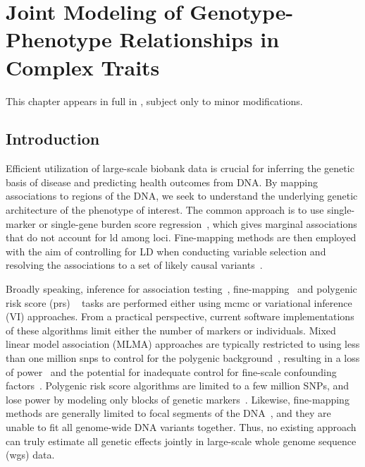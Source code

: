 
\chapter[Joint Modeling of Genotype-Phenotype Relationships in Complex Traits][Joint Modeling of Genotype-Phenotype Relationships]{Joint Modeling of Genotype-Phenotype Relationships in Complex Traits}
\label{ch:gvamp}

This chapter appears in full in , subject only to minor modifications.

\section{Introduction} 
Efficient utilization of large-scale biobank data is crucial for inferring the genetic basis of disease and predicting health outcomes from DNA. By mapping associations to regions of the DNA, we seek to understand the underlying genetic architecture of the phenotype of interest. The common approach is to use single-marker or single-gene burden score regression~\cite{regenie, bolt, SAIGE, fastGWAglm}, which gives marginal associations that do not account for \acrfull{ld} among loci. Fine-mapping methods are then employed with the aim of controlling for LD when conducting variable selection and resolving the associations to a set of likely causal variants~\cite{susie}. 

Broadly speaking, inference for association testing~\cite{regenie, bolt, SAIGE, fastGWAglm}, fine-mapping~\cite{susie} and polygenic risk score (\gls{prs}) ~\cite{Spence2022.04.18.488696, Orliac2022} tasks are performed either using \acrfull{mcmc} or variational inference (VI) approaches.
From a practical perspective, current software implementations of these algorithms limit either the number of markers or individuals. Mixed linear model association (MLMA) approaches are typically restricted to using less than one million \glspl{snp} to control for the polygenic background~\cite{regenie, bolt}, resulting in a loss of power~\cite{Orliac2022} and the potential for inadequate control for fine-scale confounding factors~\cite{popstruc}. Polygenic risk score algorithms are limited to a few million SNPs, and lose power by modeling only blocks of genetic markers~\cite{ldpred, sbayesr}. Likewise, fine-mapping methods are generally limited to focal segments of the DNA~\cite{susie}, and they are unable to fit all genome-wide DNA variants together. Thus, no existing approach can truly estimate all genetic effects jointly in large-scale whole genome sequence (\gls{wgs}) data.

